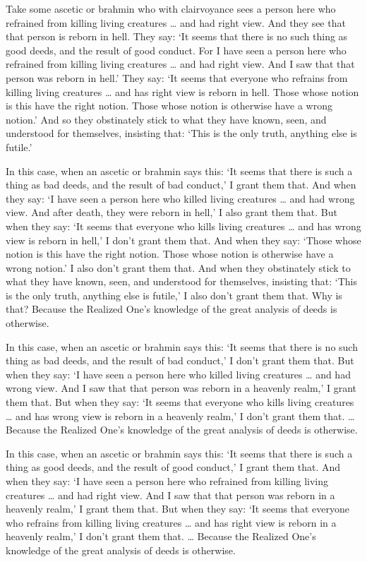 \documentclass[12pt,openany]{book}%
\begin{document}
Take some ascetic or brahmin who with clairvoyance sees a person here who refrained from killing living creatures … and had right view. And they see that that person is reborn in hell. They say: ‘It seems that there is no such thing as good deeds, and the result of good conduct. For I have seen a person here who refrained from killing living creatures … and had right view. And I saw that that person was reborn in hell.’ They say: ‘It seems that everyone who refrains from killing living creatures … and has right view is reborn in hell. Those whose notion is this have the right notion. Those whose notion is otherwise have a wrong notion.’ And so they obstinately stick to what they have known, seen, and understood for themselves, insisting that: ‘This is the only truth, anything else is futile.’ 

In this case, when an ascetic or brahmin says this: ‘It seems that there is such a thing as bad deeds, and the result of bad conduct,’ I grant them that. And when they say: ‘I have seen a person here who killed living creatures … and had wrong view. And after death, they were reborn in hell,’ I also grant them that. But when they say: ‘It seems that everyone who kills living creatures … and has wrong view is reborn in hell,’ I don’t grant them that. And when they say: ‘Those whose notion is this have the right notion. Those whose notion is otherwise have a wrong notion.’ I also don’t grant them that. And when they obstinately stick to what they have known, seen, and understood for themselves, insisting that: ‘This is the only truth, anything else is futile,’ I also don’t grant them that. Why is that? Because the Realized One’s knowledge of the great analysis of deeds is otherwise. 

In this case, when an ascetic or brahmin says this: ‘It seems that there is no such thing as bad deeds, and the result of bad conduct,’ I don’t grant them that. But when they say: ‘I have seen a person here who killed living creatures … and had wrong view. And I saw that that person was reborn in a heavenly realm,’ I grant them that. But when they say: ‘It seems that everyone who kills living creatures … and has wrong view is reborn in a heavenly realm,’ I don’t grant them that. … Because the Realized One’s knowledge of the great analysis of deeds is otherwise. 

In this case, when an ascetic or brahmin says this: ‘It seems that there is such a thing as good deeds, and the result of good conduct,’ I grant them that. And when they say: ‘I have seen a person here who refrained from killing living creatures … and had right view. And I saw that that person was reborn in a heavenly realm,’ I grant them that. But when they say: ‘It seems that everyone who refrains from killing living creatures … and has right view is reborn in a heavenly realm,’ I don’t grant them that. … Because the Realized One’s knowledge of the great analysis of deeds is otherwise. 
\end{document}
